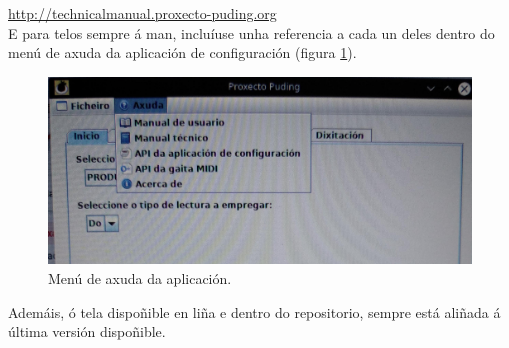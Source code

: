  \url{http://technicalmanual.proxecto-puding.org} \\
 
 E para telos sempre á man, incluíuse unha referencia a cada un deles dentro do
 menú de axuda da aplicación de configuración (figura \ref{figura:Axuda}). \\
 
 \begin{figure}[htbp]
  \centering
  \includegraphics[scale=0.2,keepaspectratio=true]{./imagenes/axuda.jpg}
  \caption{Menú de axuda da aplicación.}
  \label{figura:Axuda}
 \end{figure}
 
 Ademáis, ó tela dispoñible en liña e dentro do repositorio, sempre está aliñada
 á última versión dispoñible.
